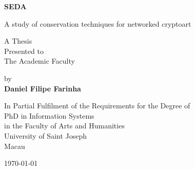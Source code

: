 

\begin{titlepage}
    \begin{center}
        \vspace*{1cm}
        
        
        
        \vspace{2cm}
        
        \Huge
        \textbf{SEDA}
        
        
        \vspace{0.5cm}
        \LARGE
        A study of conservation techniques for networked cryptoart
        
        \vspace{2cm}

        \normalsize
        A Thesis\\
        Presented to\\
        The Academic Faculty
        
        \vspace{1cm}
        
        by\\
        \textbf{Daniel Filipe Farinha}
        
     
        \vfill
       
        
 
 	\vspace{0.5cm}

        \normalsize
        In Partial Fulfilment of the Requirements for the Degree of \\
        PhD in Information Systems\\
        in the Faculty of Arts and Humanities\\
        University of Saint Joseph\\
        Macau\\
        
        \vspace{1cm}

	\monthyeardate\today
	        
    \end{center}
\end{titlepage}